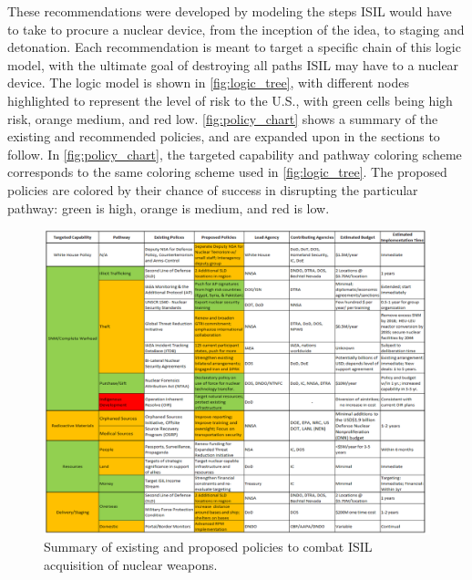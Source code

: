 \documentclass{report}
\begin{document}
These recommendations were developed by modeling the steps ISIL would have to take to procure a nuclear device, from the inception of the idea, to staging and detonation. Each recommendation is meant to target a specific chain of this logic model, with the ultimate goal of destroying all paths ISIL may have to a nuclear device. The logic model is shown in \autoref{fig:logic_tree}, with different nodes highlighted to represent the level of risk to the U.S., with green cells being high risk, orange medium, and red low. \autoref{fig:policy_chart} shows a summary of the existing and recommended policies, and are expanded upon in the sections to follow. In \autoref{fig:policy_chart}, the targeted capability and pathway coloring scheme corresponds to the same coloring scheme used in \autoref{fig:logic_tree}. The proposed policies are colored by their chance of success in disrupting the particular pathway: green is high, orange is medium, and red is low.








\begin{landscape}

\begin{figure}[H]
 \centering
 \includegraphics[trim = 0cm 0cm 0cm 0cm, clip,scale=0.55]{./figures/Policy_Chart3.png}
   \caption{Summary of existing and proposed policies to combat ISIL acquisition of nuclear weapons.}
     \label{fig:policy_chart}
\end{figure}

\end{landscape}
\end{document}
